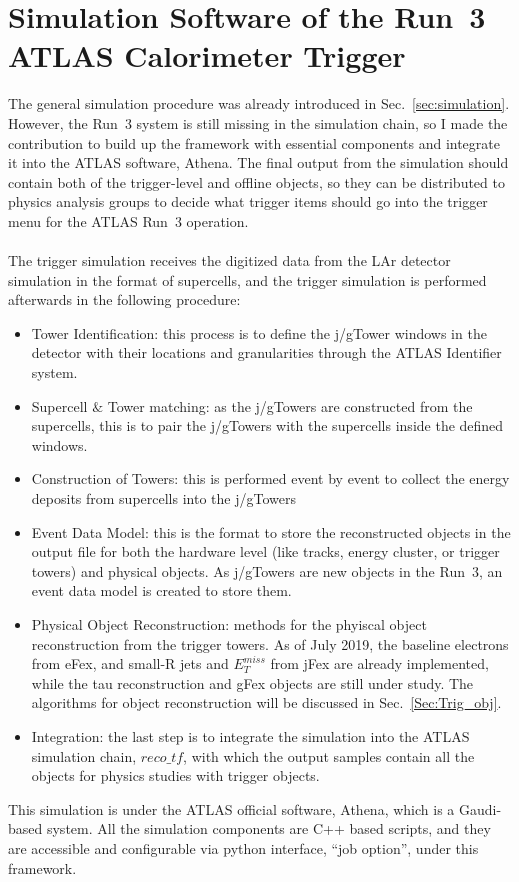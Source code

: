 \section{Simulation Software of the Run~3 ATLAS Calorimeter Trigger}
The general simulation procedure was already introduced in Sec.~\ref{sec:simulation}. However, the Run~3 system is still missing in the simulation chain, so I made the contribution to build up the framework with essential components and integrate it into the ATLAS software, Athena. The final output from the simulation should contain both of the trigger-level and offline objects, so they can be distributed to physics analysis groups to decide what trigger items should go into the trigger menu for the ATLAS Run~3 operation. 
\\
\\The trigger simulation receives the digitized data from the LAr detector simulation in the format of supercells, and the trigger simulation is performed afterwards in the following procedure:
\begin{itemize}
	\item Tower Identification: this process is to define the j/gTower windows in the detector with their locations and granularities through the ATLAS Identifier system.
	\item Supercell $\&$ Tower matching: as the j/gTowers are constructed from the supercells, this is to pair the j/gTowers with the supercells inside the defined windows.
	\item Construction of Towers: this is performed event by event to collect the energy deposits from supercells into the j/gTowers
	\item Event Data Model: this is the format to store the reconstructed objects in the output file for both the hardware level (like tracks, energy cluster, or trigger towers) and physical objects. As j/gTowers are new objects in the Run~3, an event data model is created to store them.
	\item Physical Object Reconstruction: methods for the phyiscal object reconstruction from the trigger towers. As of July 2019, the baseline electrons from eFex, and small-R jets and $E^{miss}_{T}$ from jFex are already implemented, while the tau reconstruction and gFex objects are still under study. The algorithms for object reconstruction will be discussed in Sec.~\ref{Sec:Trig_obj}. 
	\item Integration: the last step is to integrate the simulation into the ATLAS simulation chain, $reco\_tf$\cite{Stewart:2014ida}, with which the output samples contain all the objects for physics studies with trigger objects. 
\end{itemize}
\noindent
This simulation is under the ATLAS official software, Athena, which is a Gaudi-based system\cite{Mato:2010zz}. All the simulation components are C++ based scripts, and they are accessible and configurable via python interface, ``job option'', under this framework.
